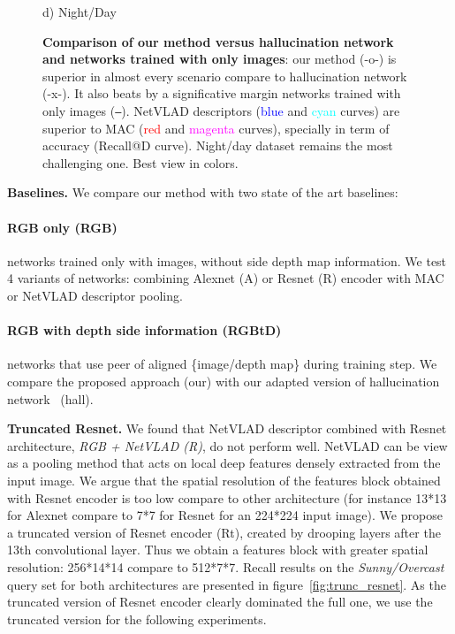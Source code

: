 \begin{figure}
\begin{minipage}{0.85\linewidth}
\begin{minipage}{0.49\linewidth}
		{\scriptsize d) Night/Day}
	\end{minipage}
	
	\end{minipage}

	\caption{\label{fig:results} \textbf{Comparison of our method versus hallucination network and networks trained with only images}: our method (-o-) is superior in almost every scenario compare to hallucination network (-x-). It also beats by a significative margin networks trained with only images (\texttt{--}). NetVLAD descriptors (\textcolor{blue}{blue} and \textcolor{cyan}{cyan} curves) are superior to MAC (\textcolor{red}{red} and \textcolor{magenta}{magenta} curves), specially in term of accuracy (Recall@D curve). Night/day dataset remains the most challenging one.  Best view in colors.}
\end{figure}

\noindent\textbf{Baselines.} We compare our method with two state of the art baselines:
    \paragraph{RGB only (RGB)} networks trained only with images, without side depth map information. We test 4 variants of networks: combining Alexnet (A) or Resnet (R) encoder with MAC or NetVLAD descriptor pooling.
    \paragraph{RGB with depth side information (RGBtD)} networks that use peer of aligned \{image/depth map\} during training step. We compare the proposed approach (our) with our adapted version of hallucination network~\cite{Hoffman2016} (hall).

\noindent\textbf{Truncated Resnet.} We found that NetVLAD descriptor combined with Resnet architecture, \textsl{RGB + NetVLAD (R)}, do not perform well. NetVLAD can be view as a pooling method that acts on local deep features densely extracted from the input image. We argue that the spatial resolution of the features block obtained with Resnet encoder is too low compare to other architecture (for instance 13*13 for Alexnet compare to 7*7 for Resnet for an 224*224 input image). We propose a truncated version of Resnet encoder (Rt), created by drooping layers after the 13th convolutional layer. Thus we obtain a features block with greater spatial resolution: 256*14*14 compare to 512*7*7. Recall results on the \textit{Sunny/Overcast} query set for both architectures are presented in figure~\ref{fig:trunc_resnet}. As the truncated version of Resnet encoder clearly dominated the full one, we use the truncated version for the following experiments.

